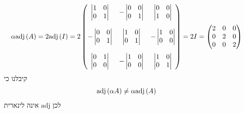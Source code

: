 \documentclass[12pt, titlepage]{article}
\begin{document}
\[
    \alpha\mathrm{adj}\left(A\right) = 2\mathrm{adj}\left(I\right) = 2 \begin{pmatrix}
        \begin{vmatrix} 1 & 0 \\ 0 & 1 \end{vmatrix} & -\begin{vmatrix} 0 & 0 \\ 0 & 1 \end{vmatrix} & \begin{vmatrix} 0 & 0 \\ 1 & 0 \end{vmatrix} \\ \\
 -       \begin{vmatrix} 0 & 0 \\ 0 & 1 \end{vmatrix} & \begin{vmatrix} 1 & 0 \\0 & 1 \end{vmatrix} & -\begin{vmatrix} 1 & 0 \\ 0 & 0\end{vmatrix} \\ \\
        \begin{vmatrix} 0 & 1 \\ 0 & 0\end{vmatrix} & -\begin{vmatrix} 1 & 0 \\ 0 & 0 \end{vmatrix} & \begin{vmatrix} 1 & 0 \\ 0 & 1\end{vmatrix}
\end{pmatrix} = 2  I= \begin{pmatrix}
    2 & 0 & 0 \\
    0 & 2 & 0 \\
    0 & 0 & 2
\end{pmatrix}
\]
קיבלנו כי
\[
    \mathrm{adj}\left(\alpha A\right) \neq \alpha \mathrm{adj}\left(A\right)
\]
לכן $\mathrm{adj}$ אינה לינארית
\end{document}
